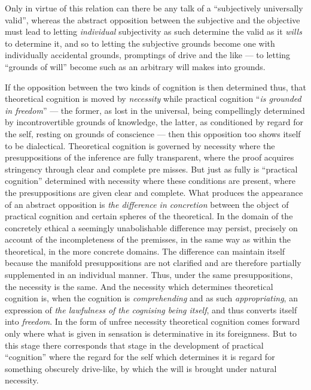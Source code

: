 \documentclass[12pt,a4paper]{book}
\begin{document}
Only in virtue of this relation can there be any talk of a ``subjectively
universally valid'', whereas the abstract opposition between the subjective
and the objective must lead to letting \emph{individual} subjectivity as such
determine the valid as it \emph{wills} to determine it, and so to letting the
subjective grounds become one with individually accidental grounds, promptings
of drive and the like --- to letting ``grounds of will'' become such as an
arbitrary will makes into grounds.

If the opposition between the two kinds of cognition is then determined thus,
that theoretical cognition is moved by \emph{necessity} while practical
cognition ``\emph{is grounded in freedom}'' --- the former, as lost in the
universal, being compellingly determined by incontrovertible grounds of
knowledge, the latter, as conditioned by regard for the self, resting on
grounds of conscience --- then this opposition too shows itself to be
dialectical. Theoretical cognition is governed by necessity where the
presuppositions of the inference are fully transparent, where the proof
acquires stringency through clear and complete pre\-%
misses. But just as fully is ``practical cognition'' determined with necessity
where these conditions are present, where the presuppositions are given clear
and complete. What produces the appearance of an abstract opposition is
\emph{the difference in concretion} between the object of practical cognition
and certain spheres of the theoretical. In the domain of the concretely
ethical a seemingly unabolishable difference may persist, precisely on account
of the incompleteness of the premisses, in the same way as within the
theoretical, in the more concrete domains. The difference can maintain itself
because the manifold presuppositions are not clarified and are therefore
partially supplemented in an individual manner. Thus, under the same
presuppositions, the necessity is the same. And the necessity which determines
theoretical cognition is, when the cognition is \emph{comprehending} and as
such \emph{appropriating}, an expression of \emph{the lawfulness of the
cognising being itself}, and thus converts itself into \emph{freedom}. In the
form of unfree necessity theoretical cognition comes forward only where what
is given in sensation is determinative in its foreignness. But to this stage
there corresponds that stage in the development of practical ``cognition''
where the regard for the self which determines it is regard for something
obscurely drive-like, by which the will is brought under natural necessity.
\end{document}
